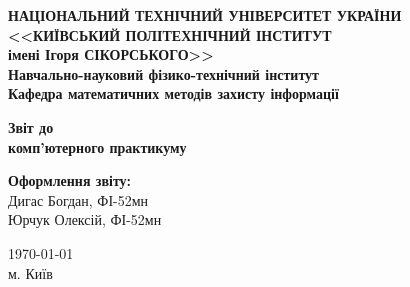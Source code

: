 \thispagestyle{empty}
\linespread{1.1}

\begin{center}
    {\bfseries\large
        НАЦІОНАЛЬНИЙ ТЕХНІЧНИЙ УНІВЕРСИТЕТ УКРАЇНИ \\
        <<КИЇВСЬКИЙ ПОЛІТЕХНІЧНИЙ ІНСТИТУТ \\
        імені Ігоря СІКОРСЬКОГО>> \\
        Навчально-науковий фізико-технічний інститут \\
        \medskip
        Кафедра математичних методів захисту інформації}
\end{center}

\begin{center}
\vspace{40mm}
{\bfseries\huge Звіт до} \\
{\bfseries\Large комп'ютерного практикуму } \\
\end{center}

\vspace{55mm}
\begin{center}
    \hfill
    \begin{minipage}[t]{0.4\textwidth}
        \begin{flushright}
            \textbf{Оформлення звіту:} \\ 
            Дигас Богдан, ФІ-52мн \\
            Юрчук Олексій, ФІ-52мн 
        \end{flushright}
    \end{minipage}
\end{center}

\vfill
\begin{center}
    \today \\
    {м. Київ}
\end{center}

\newpage
{}